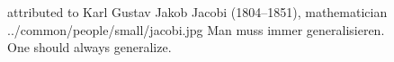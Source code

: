 \qboxnps
  { attributed to Karl Gustav Jakob Jacobi (1804--1851), mathematician
    \footnotemark
  }
  {../common/people/small/jacobi.jpg}
  {Man muss immer generalisieren.\quotec \\
   \quoteo One should always generalize.}



